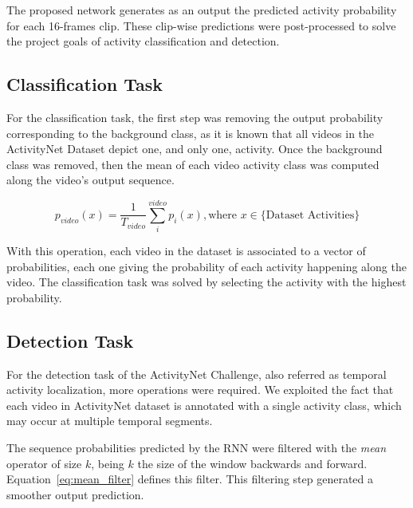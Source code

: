 The proposed network generates as an output the predicted activity probability for each 16-frames clip.
These clip-wise predictions were post-processed to solve the project goals of activity classification and detection.


\subsection{Classification Task}

For the classification task, the first step was removing the output probability corresponding to the background class, as it is known that all videos in the ActivityNet Dataset depict one, and only one, activity. Once the background class was removed, then the mean of each video activity class was computed along the video's output sequence.

\begin{equation}
	p_{video}(x) = \frac{1}{T_{video}} \sum_i^{video} p_i(x), \text{where } x \in \{ \text{Dataset Activities}\}
\end{equation}

With this operation, each video in the dataset is associated to a vector of probabilities, each one giving the probability of each activity happening along the video. The classification task was solved by selecting the activity with the highest probability.

\subsection{Detection Task}

For the detection task of the ActivityNet Challenge, also referred as temporal activity localization, more operations were required. We exploited the fact that each video in ActivityNet dataset is annotated with a single activity class, which may occur at multiple temporal segments. %

The sequence probabilities predicted by the RNN were filtered with the \textit{mean} operator of size $k$, being $k$ the size of the window backwards and forward. Equation~\ref{eq:mean_filter} defines this filter. This filtering step generated a smoother output prediction.

